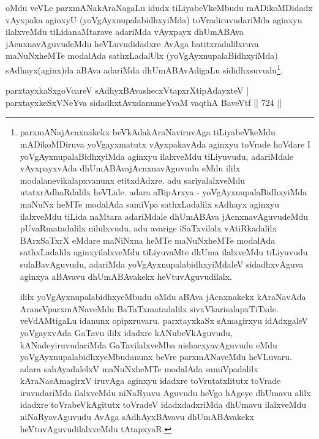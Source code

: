 \begin{artha}
oMdu veVLe parxmANakAraNagaLu idudx tiLiyabeVkeMbudu mADikoMDidadx vAyxpaka aginxyU (yoVgAyxnupalabidhxyiMda) toVradiruvudariMda aginxyu ilalxveMdu tiLidanaMtarave adariMda vAyxpayx dhUmABAva jAcnxnavAguvudeMdu heVLuvudidadxre AvAga hatitxradalilxruva maNuNxheMTe modalAda sathxLadalUlx (yoVgAyxnupalaBidhxyiMda) sAdhayx(aginx)da aBAva adariMda dhUmABAvAdigaLu sididhxsuvudu\footnote{parxmANajAcnxnakekx beVkAdakAraNaviruvAga tiLiyabeVkeMdu mADikoMDiruva yoVgayxmatutx vAyxpakavAda aginxyu toVrade hoVdare I yoVgAyxnupalaBidhxyiMda aginxyu ilalxveMdu tiLiyuvudu, adariMdale vAyxpayxvAda dhUmABAvajAcnxnavAguvudu eMdu ililx modalanevikalapxvanunx etitxdAdxre. adu sariyalalxveMdu utatxrAdhaRdalilx heVLide. adara aBipArxya - yoVgAyxnupalaBidhxyiMda maNuNx heMTe modalAda samiVpa sathxLadalilx sAdhayx aginxyu ilalxveMdu tiLida naMtara adariMdale dhUmABAva jAcnxnavAguvudeMdu pUvaRmatadalilx nilulxvudu, adu avarige iSaTxvilalx vAtiRkadalilx BArxSaTxrX eMdare maNiNxna heMTe maNuNxheMTe modalAda sathxLadalilx aginxyilalxveMdu tiLiyuvaMte dhUma ilalxveMdu tiLiyuvudu sulaBavAguvudu, adariMda yoVgAyxnupalabidhxyiMdaleV sidadhxvAguva aginxya aBAvavu dhUmABAvakekx heVtuvAguvudilalx.

ililx yoVgAyxnupalabidhxyeMbudu oMdu aBAva jAcnxnakekx kAraNavAda AraneVparxmANaveMdu BaTaTxmatadalilx sivxVkarisalapxTiTxde. veVdAMtigaLu idanunx opipxruvaru. parxtayxkaSx sAmagirxyu idAdxgaleV yoVgayxvAda GaTavu ililx idadxre kANubeVkAguvudu, kANadeyiruvudariMda GaTavilalxveMba nishacxyavAguvudu eMdu yoVgAyxnupalabidhxyeMbudanunx beVre parxmANaveMdu heVLuvaru. adara sahAyadalelxV maNuNxheMTe modalAda samiVpadalilx kAraNasAmagirxV iruvAga aginxyu idadxre toVrutatxlitutx toVrade iruvudariMda ilalxveMdu niNaRyavu Aguvudu heVgo hAgeye dhUmavu alilx idadxre toVrabeVkAgitutx  toVradeV idadxdadxriMda dhUmavu  ilalxveMdu niNaRyavAguvudu AvAga sAdhAyxBAvavu dhUmABAvakekx heVtuvAguvudilalxveMdu tAtapxyaR.}.
\end{artha}


\begin{shl}
parxtayxkaSxgoVcareV sAdhyxBAvashecxVtapxrXtipAdayxteV | \\
parxtayxkeSxVNeYva sidadhxtAvxdanumeYvaM vaqthA BaveVtf \hfill||  724 ||  
\end{shl}

